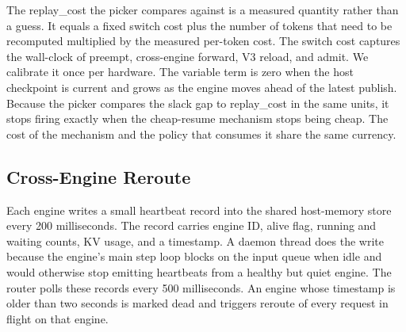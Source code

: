 
The replay\_cost the picker compares against is a measured quantity rather than a guess. It equals a fixed switch cost plus the number of tokens that need to be recomputed multiplied by the measured per-token cost. The switch cost captures the wall-clock of preempt, cross-engine forward, V3 reload, and admit. We calibrate it once per hardware. The variable term is zero when the host checkpoint is current and grows as the engine moves ahead of the latest publish. Because the picker compares the slack gap to replay\_cost in the same units, it stops firing exactly when the cheap-resume mechanism stops being cheap. The cost of the mechanism and the policy that consumes it share the same currency.

\subsection{Cross-Engine Reroute}


Each engine writes a small heartbeat record into the shared host-memory store every 200 milliseconds. The record carries engine ID, alive flag, running and waiting counts, KV usage, and a timestamp. A daemon thread does the write because the engine's main step loop blocks on the input queue when idle and would otherwise stop emitting heartbeats from a healthy but quiet engine. The router polls these records every 500 milliseconds. An engine whose timestamp is older than two seconds is marked dead and triggers reroute of every request in flight on that engine.


